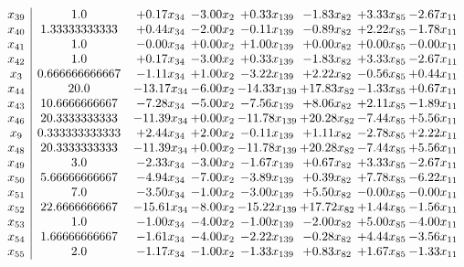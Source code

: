 \documentclass[8pt]{article}
\begin{document}
\[\begin{array}{c| c c@{\hskip 2pt} c@{\hskip 2pt} c@{\hskip 2pt} c@{\hskip 2pt} c@{\hskip 2pt} c@{\hskip 2pt} }
 x_{39}   &  1.0 & +  0.17 x_{34} & -3.00 x_{2} & +  0.33 x_{139} & -1.83 x_{82} & +  3.33 x_{85} & -2.67 x_{11}\\
 x_{40}   &  1.33333333333 & +  0.44 x_{34} & -2.00 x_{2} & -0.11 x_{139} & -0.89 x_{82} & +  2.22 x_{85} & -1.78 x_{11}\\
 x_{41}   &  1.0 & -0.00 x_{34} & +  0.00 x_{2} & +  1.00 x_{139} & +  0.00 x_{82} & +  0.00 x_{85} & -0.00 x_{11}\\
 x_{42}   &  1.0 & +  0.17 x_{34} & -3.00 x_{2} & +  0.33 x_{139} & -1.83 x_{82} & +  3.33 x_{85} & -2.67 x_{11}\\
 x_{3}   &  0.666666666667 & -1.11 x_{34} & +  1.00 x_{2} & -3.22 x_{139} & +  2.22 x_{82} & -0.56 x_{85} & +  0.44 x_{11}\\
 x_{44}   &  20.0 & -13.17 x_{34} & -6.00 x_{2} & -14.33 x_{139} & + 17.83 x_{82} & -1.33 x_{85} & +  0.67 x_{11}\\
 x_{43}   &  10.6666666667 & -7.28 x_{34} & -5.00 x_{2} & -7.56 x_{139} & +  8.06 x_{82} & +  2.11 x_{85} & -1.89 x_{11}\\
 x_{46}   &  20.3333333333 & -11.39 x_{34} & +  0.00 x_{2} & -11.78 x_{139} & + 20.28 x_{82} & -7.44 x_{85} & +  5.56 x_{11}\\
 x_{9}   &  0.333333333333 & +  2.44 x_{34} & +  2.00 x_{2} & -0.11 x_{139} & +  1.11 x_{82} & -2.78 x_{85} & +  2.22 x_{11}\\
 x_{48}   &  20.3333333333 & -11.39 x_{34} & +  0.00 x_{2} & -11.78 x_{139} & + 20.28 x_{82} & -7.44 x_{85} & +  5.56 x_{11}\\
 x_{49}   &  3.0 & -2.33 x_{34} & -3.00 x_{2} & -1.67 x_{139} & +  0.67 x_{82} & +  3.33 x_{85} & -2.67 x_{11}\\
 x_{50}   &  5.66666666667 & -4.94 x_{34} & -7.00 x_{2} & -3.89 x_{139} & +  0.39 x_{82} & +  7.78 x_{85} & -6.22 x_{11}\\
 x_{51}   &  7.0 & -3.50 x_{34} & -1.00 x_{2} & -3.00 x_{139} & +  5.50 x_{82} & -0.00 x_{85} & -0.00 x_{11}\\
 x_{52}   &  22.6666666667 & -15.61 x_{34} & -8.00 x_{2} & -15.22 x_{139} & + 17.72 x_{82} & +  1.44 x_{85} & -1.56 x_{11}\\
 x_{53}   &  1.0 & -1.00 x_{34} & -4.00 x_{2} & -1.00 x_{139} & -2.00 x_{82} & +  5.00 x_{85} & -4.00 x_{11}\\
 x_{54}   &  1.66666666667 & -1.61 x_{34} & -4.00 x_{2} & -2.22 x_{139} & -0.28 x_{82} & +  4.44 x_{85} & -3.56 x_{11}\\
 x_{55}   &  2.0 & -1.17 x_{34} & -1.00 x_{2} & -1.33 x_{139} & +  0.83 x_{82} & +  1.67 x_{85} & -1.33 x_{11}\\

\end{array}\]
\end{document}

